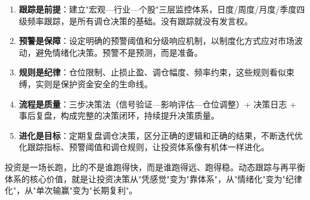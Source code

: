 \begin{keyinsight}
\vspace{-0.3em}
\begin{enumerate}[leftmargin=1.8em]
\item \textbf{跟踪是前提}：建立"宏观—行业—个股"三层监控体系，日度/周度/月度/季度四级频率跟踪，是所有调仓决策的基础。没有跟踪就没有发言权。

\item \textbf{预警是保障}：设定明确的预警阈值和分级响应机制，以制度化方式应对市场波动，避免情绪化决策。预警不是预测，而是准备。

\item \textbf{规则是纪律}：仓位限制、止损止盈、调仓幅度、频率约束，这些规则看似束缚，实则是保护资金安全的生命线。

\item \textbf{流程是质量}：三步决策法（信号验证—影响评估—仓位调整）+ 决策日志 + 事后复盘，构成完整的决策闭环，持续提升决策质量。

\item \textbf{进化是目标}：定期复盘调仓决策，区分正确的逻辑和正确的结果，不断迭代优化跟踪指标、预警阈值和调仓规则，让投资体系像有机体一样进化。
\end{enumerate}

投资是一场长跑，比的不是谁跑得快，而是谁跑得远、跑得稳。动态跟踪与再平衡体系的核心价值，就是让投资决策从"凭感觉"变为"靠体系"，从"情绪化"变为"纪律化"，从"单次输赢"变为"长期复利"。
\end{keyinsight}
